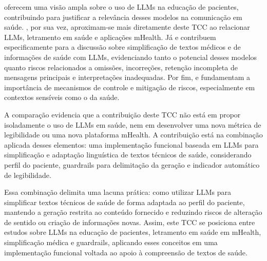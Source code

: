  oferecem uma visão ampla sobre o uso de LLMs na educação de pacientes, contribuindo para justificar a relevância desses modelos na comunicação em saúde. , por sua vez, aproximam-se mais diretamente deste TCC ao relacionar LLMs, letramento em saúde e aplicações mHealth. Já  e  contribuem especificamente para a discussão sobre simplificação de textos médicos e de informações de saúde com LLMs, evidenciando tanto o potencial desses modelos quanto riscos relacionados a omissões, incorreções, retenção incompleta de mensagens principais e interpretações inadequadas. Por fim,  e  fundamentam a importância de mecanismos de controle e mitigação de riscos, especialmente em contextos sensíveis como o da saúde.

A comparação evidencia que a contribuição deste TCC não está em propor isoladamente o uso de LLMs em saúde, nem em desenvolver uma nova métrica de legibilidade ou uma nova plataforma mHealth. A contribuição está na combinação aplicada desses elementos: uma implementação funcional baseada em LLMs para simplificação e adaptação linguística de textos técnicos de saúde, considerando perfil do paciente, guardrails para delimitação da geração e indicador automático de legibilidade.

Essa combinação delimita uma lacuna prática: como utilizar LLMs para simplificar textos técnicos de saúde de forma adaptada ao perfil do paciente, mantendo a geração restrita ao conteúdo fornecido e reduzindo riscos de alteração de sentido ou criação de informações novas. Assim, este TCC se posiciona entre estudos sobre LLMs na educação de pacientes, letramento em saúde em mHealth, simplificação médica e guardrails, aplicando esses conceitos em uma implementação funcional voltada ao apoio à compreensão de textos de saúde.
